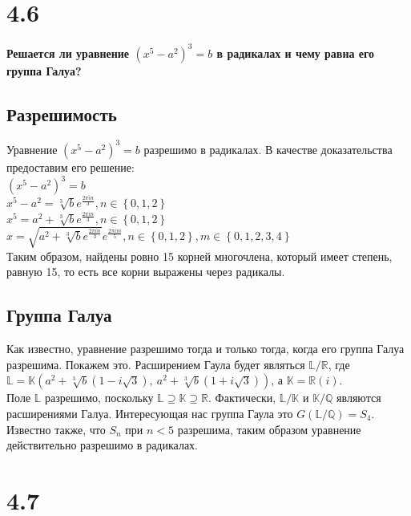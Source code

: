\documentclass[a4paper,14pt]{article}
\begin{document}
\section*{4.6}

\begin{center}
	\LARGE{\textbf{Решается ли уравнение $\left( x^{5}-a^{2}\right) ^{3}=b$ в радикалах и чему равна его группа Галуа?}}\\
\end{center}

\subsection*{Разрешимость}
Уравнение $\left( x^{5}-a^{2}\right) ^{3}=b$ разрешимо в радикалах. В качестве доказательства предоставим его решение:
\\$\left( x^{5}-a^{2}\right) ^{3}=b$
\\$x^{5}-a^{2}=\sqrt [3] {b}e^{\frac {2\pi in}{3}},n\in \left\{ 0,1,2\right\} $
\\$x^{5}=a^{2}+\sqrt [3] {b}e^{\frac {2\pi in}{3}},n\in \left\{ 0,1,2\right\} $
\\$x=\sqrt {a^{2}+\sqrt [3] {b}e^{\frac {2\pi in}{3}}}e^{\frac {2\pi im}{5}},n\in \left\{ 0,1,2\right\} ,m\in \left\{ 0,1,2,3,4\right\} $
\\Таким образом, найдены ровно 15 корней многочлена, который имеет степень, равную 15, то есть все корни выражены через радикалы.

\subsection*{Группа Галуа}
Как известно, уравнение разрешимо тогда и только тогда, когда его группа Галуа разрешима. Покажем это. Расширением Гаула будет являться $\mathbb {L/R}$, где $\mathbb{L} = \mathbb{K}(a ^{2}+\sqrt [3] {b}\left( 1-i\sqrt {3}\right), \: a ^{2}+\sqrt [3] {b}\left( 1+i\sqrt {3}\right)) $, а $\mathbb{K} = \mathbb{R}(i)$.
\\Поле $\mathbb{L}$ разрешимо, поскольку $\mathbb{L} \supseteq \mathbb{K} \supseteq \mathbb{R}$. Фактически, $\mathbb{L/K}$ и $\mathbb{K/Q}$ являются расширениями Галуа. Интересующая нас группа Гаула это $G(\mathbb{L/Q}) = S_4$. Известно также, что $S_n$ при $n < 5$ разрешима, таким образом уравнение действительно разрешимо в радикалах.

\section*{4.7}
\end{document}
